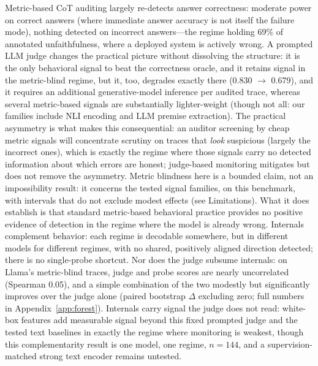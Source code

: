 \documentclass{article}
\begin{document}
Metric-based CoT auditing largely re-detects answer correctness: moderate power on correct answers (where immediate answer accuracy is not itself the failure mode), nothing detected on incorrect answers---the regime holding 69\% of annotated unfaithfulness, where a deployed system is actively wrong. A prompted LLM judge changes the practical picture without dissolving the structure: it is the only behavioral signal to beat the correctness oracle, and it retains signal in the metric-blind regime, but it, too, degrades exactly there (0.830 $\to$ 0.679), and it requires an additional generative-model inference per audited trace, whereas several metric-based signals are substantially lighter-weight (though not all: our families include NLI encoding and LLM premise extraction). The practical asymmetry is what makes this consequential: an auditor screening by cheap metric signals will concentrate scrutiny on traces that \emph{look} suspicious (largely the incorrect ones), which is exactly the regime where those signals carry no detected information about which errors are honest; judge-based monitoring mitigates but does not remove the asymmetry. Metric blindness here is a bounded claim, not an impossibility result: it concerns the tested signal families, on this benchmark, with intervals that do not exclude modest effects (see Limitations). What it does establish is that standard metric-based behavioral practice provides no positive evidence of detection in the regime where the model is already wrong. Internals complement behavior: each regime is decodable somewhere, but in different models for different regimes, with no shared, positively aligned direction detected; there is no single-probe shortcut. Nor does the judge subsume internals: on Llama's metric-blind traces, judge and probe scores are nearly uncorrelated (Spearman 0.05), and a simple combination of the two modestly but significantly improves over the judge alone (paired bootstrap $\Delta$ excluding zero; full numbers in Appendix~\ref{app:forest}). Internals carry signal the judge does not read: white-box features add measurable signal beyond this fixed prompted judge and the tested text baselines in exactly the regime where monitoring is weakest, though this complementarity result is one model, one regime, $n{=}144$, and a supervision-matched strong text encoder remains untested.
\end{document}
